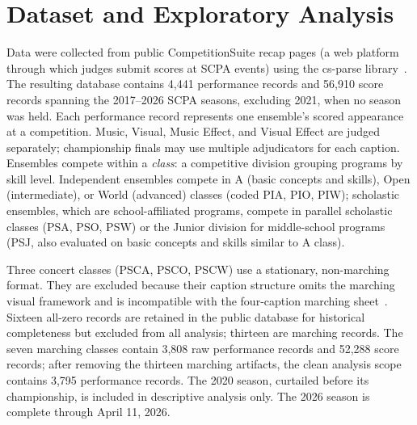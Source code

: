 \section{Dataset and Exploratory Analysis}
\label{sec:dataset}

Data were collected from public CompetitionSuite recap pages (a web platform through which judges submit scores at SCPA events) using
the cs-parse library~\cite{scpadb2026, csparse2026}. The resulting database
contains 4,441 performance records and 56,910 score records spanning the
2017--2026 SCPA seasons, excluding 2021, when no season was held. Each
performance record represents one ensemble's scored appearance at a
competition. Music, Visual, Music Effect, and Visual Effect are judged
separately; championship finals may use multiple adjudicators for each caption.
Ensembles compete within a \emph{class}: a
competitive division grouping programs by skill level. Independent ensembles
compete in A (basic concepts and skills), Open (intermediate), or World
(advanced) classes (coded PIA, PIO, PIW); scholastic ensembles, which are
school-affiliated programs, compete in parallel scholastic classes (PSA, PSO,
PSW) or the Junior division for middle-school programs (PSJ, also evaluated on
basic concepts and skills similar to A class).

Three concert classes (PSCA, PSCO, PSCW) use a stationary, non-marching format. They are excluded because their caption structure omits the marching
visual framework and is incompatible with the four-caption marching
sheet~\cite{wgi2026scoresheets}. Sixteen
all-zero records are retained in the public database for historical
completeness but excluded from all analysis; thirteen are marching records. The
seven marching classes contain 3,808 raw performance records and 52,288 score records;
after removing the thirteen marching artifacts, the clean analysis scope
contains 3,795 performance records. The 2020 season, curtailed before its
championship, is included in descriptive analysis only. The 2026 season is
complete through April 11, 2026.


